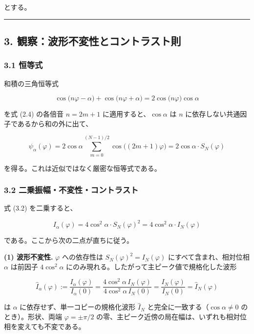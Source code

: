 \documentclass[
]{ltjsarticle}
\begin{document}
とする。

\begin{center}\rule{0.5\linewidth}{0.5pt}\end{center}

\subsection{3.
観察：波形不変性とコントラスト則}\label{ux89b3ux5bdfux6ce2ux5f62ux4e0dux5909ux6027ux3068ux30b3ux30f3ux30c8ux30e9ux30b9ux30c8ux5247}

\subsubsection{3.1 恒等式}\label{ux6052ux7b49ux5f0f}

和積の三角恒等式

\[
\cos\!\big(n\varphi-\alpha\big)+\cos\!\big(n\varphi+\alpha\big)=2\cos\!\big(n\varphi\big)\cos\alpha
\tag{3.1}
\]

を式 (2.4) の各倍音 \(n=2m+1\) に適用すると、\(\cos\alpha\) は \(n\)
に依存しない共通因子であるから和の外に出て、

\[
\psi_\alpha(\varphi)
=2\cos\alpha\sum_{m=0}^{(N-1)/2}\cos\!\big((2m+1)\varphi\big)
=2\cos\alpha\cdot S_N(\varphi)
\tag{3.2}
\]

を得る。これは近似ではなく厳密な恒等式である。

\subsubsection{3.2
二乗振幅・不変性・コントラスト}\label{ux4e8cux4e57ux632fux5e45ux4e0dux5909ux6027ux30b3ux30f3ux30c8ux30e9ux30b9ux30c8}

式 (3.2) を二乗すると、

\[
I_\alpha(\varphi)=4\cos^2\!\alpha\cdot S_N(\varphi)^2=4\cos^2\!\alpha\cdot I_N(\varphi)
\tag{3.3}
\]

である。ここから次の二点が直ちに従う。

\textbf{(1) 波形不変性.} \(\varphi\) への依存性は
\(S_N(\varphi)^2=I_N(\varphi)\) にすべて含まれ、相対位相 \(\alpha\)
は前因子 \(4\cos^2\!\alpha\)
にのみ現れる。したがって主ピーク値で規格化した波形

\[
\widehat{I}_\alpha(\varphi):=\frac{I_\alpha(\varphi)}{I_\alpha(0)}
=\frac{4\cos^2\!\alpha\,I_N(\varphi)}{4\cos^2\!\alpha\,I_N(0)}
=\frac{I_N(\varphi)}{I_N(0)}=\widehat{I}_N(\varphi)
\tag{3.4}
\]

は \(\alpha\) に依存せず、単一コピーの規格化波形 \(\widehat{I}_N\)
と完全に一致する（\(\cos\alpha\neq0\) のとき）。形状、両端
\(\varphi=\pm\pi/2\)
の零、主ピーク近傍の局在幅は、いずれも相対位相を変えても不変である。
\end{document}
